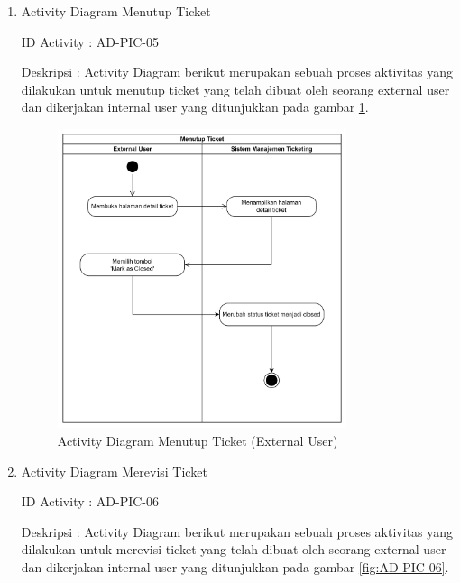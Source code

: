 \documentclass[12pt]{article}
\begin{document}
\begin{enumerate}[label=\textbf{4.\arabic*.}]
\begin{enumerate} [label=\textbf{4.2.\arabic*.}, wide, labelwidth=!, labelindent=0pt]
\begin{enumerate}[label=\textbf{4.2.1.\arabic*.}, wide, labelwidth=!, labelindent=0pt]
\begin{enumerate}[label=\arabic*.]
                \item Activity Diagram Menutup Ticket

                \noindent ID Activity	: AD-PIC-05

                \noindent Deskripsi	: Activity Diagram berikut merupakan sebuah proses aktivitas yang dilakukan untuk menutup ticket yang telah dibuat oleh seorang external user dan dikerjakan internal user yang ditunjukkan pada gambar \ref{fig:AD-PIC-05}.


                \begin{figure}[H]
                    \centering \includegraphics[width=0.8\textwidth]{images/activity/ex/Menutup Ticket.png}
                    \caption{Activity Diagram Menutup Ticket (External User)}
                    \label{fig:AD-PIC-05}
                \end{figure}

                \item Activity Diagram Merevisi Ticket

                \noindent ID Activity	: AD-PIC-06

                \noindent Deskripsi	: Activity Diagram berikut merupakan sebuah proses aktivitas yang dilakukan untuk merevisi ticket yang telah dibuat oleh seorang external user dan dikerjakan internal user yang ditunjukkan pada gambar \ref{fig:AD-PIC-06}.



\end{enumerate}
\end{enumerate}
\end{enumerate}
\end{enumerate}
\end{document}
